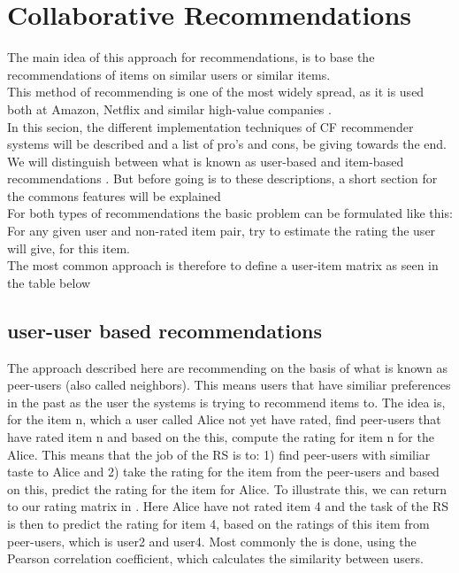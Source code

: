 \section{Collaborative Recommendations}
\label{sub:basic_collaborative_recommendations}
The main idea of this approach for recommendations, is to base the recommendations of items on similar users or similar items.\\
This method of recommending is one of the most widely spread, as it is used both at Amazon, Netflix and similar high-value companies .\\
In this secion, the different implementation techniques of CF recommender systems will be described and a list of pro's and cons, be giving towards the end. We will distinguish between what is known as user-based and item-based recommendations . But before going is to these descriptions, a short section for the commons features will be explained\\

For both types of recommendations the basic problem can be formulated like this: For any given user and non-rated item pair, try to estimate the rating the user will give, for this item.\\
The most common approach is therefore to define a user-item matrix as seen in the table below 


\subsection{user-user based recommendations} %
\label{sub:user_user_based_recommendations}
The approach described here are recommending on the basis of what is known as peer-users (also called neighbors). This means users that have similiar preferences in the past as the user the systems is trying to recommend items to. The idea is, for the item n, which a user called Alice not yet have rated, find peer-users that have rated item n and based on the this, compute the rating for item n for the Alice. This means that the job of the RS is to: 1) find peer-users with similiar taste to Alice and 2) take the rating for the item from the peer-users and based on this, predict the rating for the item for Alice.
To illustrate this, we can return to our rating matrix in . Here Alice have not rated item 4 and the task of the RS is then to predict the rating for item 4, based on the ratings of this item from peer-users, which is user2 and user4. Most commonly the is done, using the Pearson correlation coefficient, which calculates the similarity between users.

